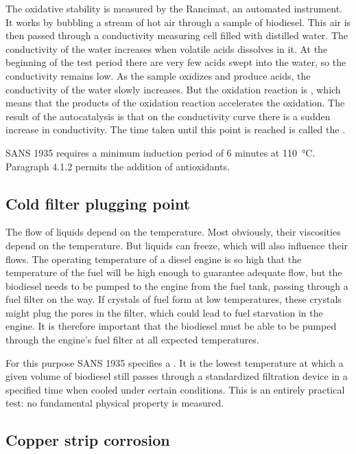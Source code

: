 
The oxidative stability is measured by the Rancimat, an automated instrument. It
works by bubbling a stream of hot air through a sample of biodiesel. This air is
then passed through a conductivity measuring cell filled with distilled water.
The conductivity of the water increases when volatile acids dissolves in it. At
the beginning of the test period there are very few acids swept into the water,
so the conductivity remains low. As the sample oxidizes and produce acids, the
conductivity of the water slowly increases. But the oxidation reaction is
, which means that the products of the oxidation reaction
accelerates the oxidation. The result of the autocatalysis is that on the
conductivity curve there is a sudden increase in conductivity. The time taken
until this point is reached is called the .

SANS 1935 requires a minimum induction period of 6 minutes at
\SI{110}{\celsius}. Paragraph 4.1.2 permits the addition of antioxidants.

\subsection{Cold filter plugging point}

The flow of liquids depend on the temperature. Most obviously, their viscosities
depend on the temperature. But liquids can freeze, which will also influence
their flows. The operating temperature of a diesel engine is so high that the
temperature of the fuel will be high enough to guarantee adequate flow, but the
biodiesel needs to be pumped to the engine from the fuel tank, passing through a
fuel filter on the way. If crystals of fuel form at low temperatures, these
crystals might plug the pores in the filter, which could lead to fuel starvation
in the engine. It is therefore important that the biodiesel must be able to be
pumped through the engine's fuel filter at all expected temperatures.

For this purpose SANS 1935 specifies a . It
is the lowest temperature at which a given volume of biodiesel still passes
through a standardized filtration device in a specified time when cooled under
certain conditions. This is an entirely practical test: no fundamental
physical property is measured.

\subsection{Copper strip corrosion}

